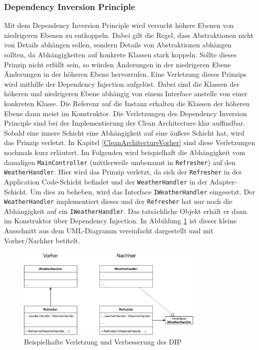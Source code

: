 \subsubsection{Dependency Inversion Principle}\label{sec:dependency_inversion}
Mit dem Dependency Inversion Principle wird versucht höhere Ebenen von niedrigeren Ebenen zu entkoppeln. Dabei gilt die Regel, dass Abstraktionen nicht von Details abhängen sollen, sondern Details von Abstraktionen abhängen sollten, da Abhängigkeiten auf konkrete Klassen stark koppeln. Sollte dieses Prinzip nicht erfüllt sein, so würden Änderungen in der niedrigeren Ebene Änderungen in der höheren Ebene hervorrufen. Eine Verletzung dieses Prinzips wird mithilfe der Dependency Injection aufgelöst. Dabei sind die Klassen der höheren und niedrigeren Ebene abhängig von einem Interface anstelle von  einer konkreten Klasse. Die Referenz auf die Instanz erhalten die Klassen der höheren Ebene dann meist im Konstruktor.
Die Verletzungen des Dependency Inversion Principle sind bei der Implementierung der Clean Architecture klar auffindbar. Sobald eine innere Schicht eine Abhängigkeit auf eine äußere Schicht hat, wird das Prinzip verletzt. In Kapitel \ref{CleanArchitectureVorher} sind diese Verletzungen nochmals kurz erläutert. Im Folgenden wird beispielhaft die Abhängigkeit vom damaligen \texttt{MainController} (mittlerweile umbenannt in \texttt{Refresher}) auf den \texttt{WeatherHandler}. Hier wird das Prinzip verletzt, da sich der \texttt{Refresher} in der Application Code-Schicht befindet und der \texttt{WeatherHandler} in der Adapter-Schicht. Um dies zu beheben, wird das Interface \texttt{IWeatherHandler} eingesetzt. Der \texttt{WeatherHandler} implementiert dieses und der \texttt{Refresher} hat nur noch die Abhängigkeit auf ein \texttt{IWeatherHandler}. Das tatsächliche Objekt erhält er dann im Konstruktor über Dependency Injection. In Abbildung \ref{DIP} ist dieser kleine Ausschnitt aus dem UML-Diagramm vereinfacht dargestellt und mit Vorher/Nachher betitelt.


\begin{figure}[ht]
\centering
\includegraphics[width=0.8\textwidth]{Bilder/DIP}
\caption[Beispielhafte Verletzung und Verbesserung des DIP]{\label{DIP}Beispielhafte Verletzung und Verbesserung des DIP}
\end{figure}
